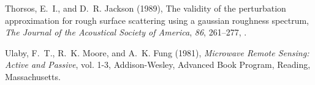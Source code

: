 \documentclass[agums,grl]{agutexSI}
\begin{document}
\begin{thebibliography}{22}
Thorsos, E.~I., and D.~R. Jackson (1989), The validity of the perturbation
  approximation for rough surface scattering using a gaussian roughness
  spectrum, \textit{The Journal of the Acoustical Society of America},
  \textit{86}, 261--277, .

Ulaby, F.~T., R.~K. Moore, and A.~K. Fung (1981), \textit{Microwave Remote
  Sensing: Active and Passive}, vol. 1-3, Addison-Wesley, Advanced Book
  Program, Reading, Massachusetts.

\end{thebibliography}
\end{document}
